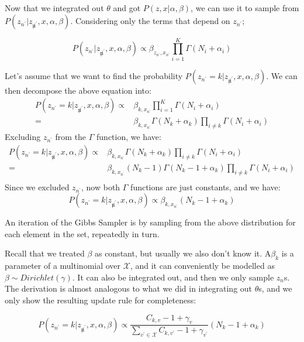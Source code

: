 \documentclass{article}%
\begin{document}
Now that we integrated out $\theta$ and got $P(z, x|\alpha, \beta)$, we can use it to sample from $P(z_{n^\prime}|z_{\not n^\prime}, x, \alpha, \beta)$. Considering only the terms that depend on $z_{n^\prime}$;

\begin{equation*}
P(z_{n^\prime}|z_{\not n^\prime}, x, \alpha, \beta) \propto \beta_{z_{n^\prime}, x_{n^\prime}}  \prod_{i=1}^K \Gamma(N_i + \alpha_i)
\end{equation*}

Let's assume that we want to find the probability $P(z_{n^\prime} = k|z_{\not n^\prime}, x, \alpha, \beta)$. We can then decompose the above equation into:
\begin{align*}
P(z_{n^\prime} = k|z_{\not n^\prime}, x, \alpha, \beta) \propto& \beta_{k, x_{n^\prime}}  \prod_{i=1}^K \Gamma(N_i + \alpha_i)\\
=&\beta_{k, x_{n^\prime}}  \Gamma(N_k + \alpha_k)\prod_{i\neq k} \Gamma(N_i + \alpha_i)
\end{align*}
Excluding $z_{n^\prime}$ from the $\Gamma$ function, we have:
\begin{align*}
P(z_{n^\prime} = k|z_{\not n^\prime}, x, \alpha, \beta) \propto&\beta_{k, x_{n^\prime}}  \Gamma(N_k + \alpha_k)\prod_{i\neq k} \Gamma(N_i + \alpha_i)\\
=& \beta_{k, x_{n^\prime}} (N_k - 1) \Gamma(N_k -1 + \alpha_k)\prod_{i\neq k} \Gamma(N_i + \alpha_i)\\
\end{align*}
Since we excluded $z_{n^\prime}$, now both $\Gamma$ functions are just constants, and we have:
\begin{equation*}
P(z_{n^\prime} = k|z_{\not n^\prime}, x, \alpha, \beta) \propto \beta_{k, x_{n^\prime}} (N_k - 1 + \alpha_k)
\end{equation*}

An iteration of the Gibbs Sampler is by sampling from the above distribution for each element in the set, repeatedly in turn.

Recall that we treated $\beta$ as constant, but usually we also don't know it. A$\beta_k$ is a parameter of a multinomial over $\mathcal{X}$, and it can conveniently be modelled as $\beta \sim Dirichlet(\gamma)$. It can also be integrated out, and then we only sample $z_n$s. The derivation is almost analogous to what we did in integrating out $\theta$s, and we only show the resulting update rule for completeness:

\begin{equation*}
P(z_{n^\prime} = k|z_{\not n^\prime}, x, \alpha, \beta) \propto \frac{C_{k,v}  -1 + \gamma_{v}}{\sum_{ v^{\prime} \in \mathcal{X}}C_{k,v^{\prime}} - 1 + \gamma_{v^{\prime}}} (N_k - 1 + \alpha_k)
\end{equation*}
\end{document}
